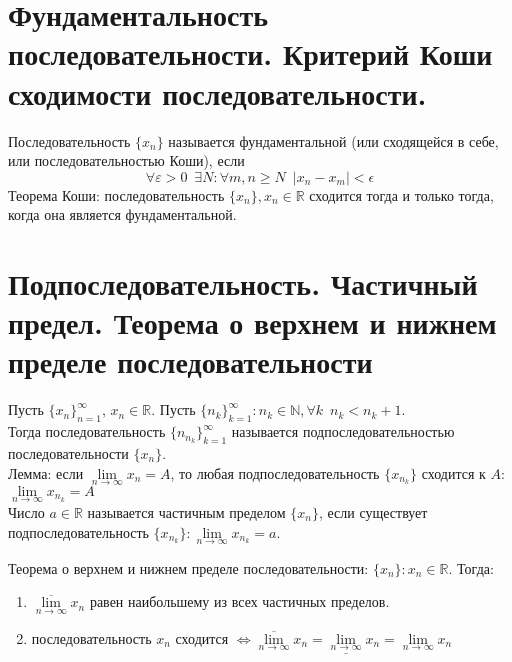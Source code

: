 \documentclass[11pt, a4paper]{article}
\def\R{\mathbb{R}}
\def\N{\mathbb{N}}
\def\sp{\, \, \,}
\def\linf{\lim \limits_{n \to \infty}}
\begin{document}
    \section{Фундаментальность последовательности. Критерий Коши сходимости последовательности.}
    Последовательность $\{x_n\}$ называется фундаментальной (или сходящейся в себе, или последовательностью Коши), если
    $$\forall \varepsilon > 0 \sp \exists N: \forall m,n \geq N \sp |x_n - x_m| < \epsilon$$
    Теорема Коши: последовательность $\{x_n\}, x_n \in \R$ сходится тогда и только тогда, когда она является фундаментальной.

    \section{Подпоследовательность. Частичный предел. Теорема о верхнем и нижнем пределе последовательности}
    Пусть $\{x_n\}_{n=1}^{\infty}$, $x_n \in \R$. Пусть $\{n_k\}_{k=1}^{\infty}: n_k \in \N , \forall k \sp n_k < n_k+1$.\\
    Тогда последовательность $\{n_{n_k}\}_{k=1}^{\infty}$ называется подпоследовательностью последовательности $\{x_n\}$.\\
    
    Лемма: если $\linf x_n = A$, то любая подпоследовательность $\{x_{n_k}\}$ сходится к $A$: $\linf x_{n_k} = A$\\
    
    Число $a \in \R$ называется частичным пределом $\{x_n\}$, если существует подпоследовательность $\{x_{n_k}\}: \linf x_{n_k} = a$.
    
    Теорема о верхнем и нижнем пределе последовательности: $\{x_n\}: x_n \in \R$. Тогда:
    \begin{enumerate}
        \item $\overline{\linf} x_n$ равен наибольшему из всех частичных пределов.
        \item последовательность $x_n$ сходится $\Leftrightarrow \overline{\linf} x_n = \underline{\linf} x_n = \linf x_n$
    \end{enumerate}
\end{document}
